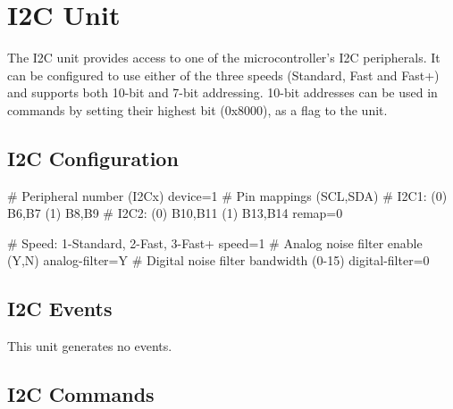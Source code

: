 \section{I2C Unit}

The I2C unit provides access to one of the microcontroller's I2C peripherals. It can be configured to use either of the three speeds (Standard, Fast and Fast+) and supports both 10-bit and 7-bit addressing. 10-bit addresses can be used in commands by setting their highest bit (0x8000), as a flag to the unit. 

\subsection{I2C Configuration}

\begin{inicode}
[I2C:d@4]
# Peripheral number (I2Cx)
device=1
# Pin mappings (SCL,SDA)
#  I2C1: (0) B6,B7    (1) B8,B9
#  I2C2: (0) B10,B11  (1) B13,B14
remap=0

# Speed: 1-Standard, 2-Fast, 3-Fast+
speed=1
# Analog noise filter enable (Y,N)
analog-filter=Y
# Digital noise filter bandwidth (0-15)
digital-filter=0
\end{inicode}

\subsection{I2C Events}

This unit generates no events.

\subsection{I2C Commands}

